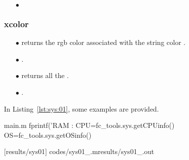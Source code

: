 \begin{itemize}
\item[$\bullet$] 

\end{itemize}

\subsubsection{xcolor}
\begin{itemize}
\item[$\bullet$]  returns the rgb color associated with the string color .
\item[$\bullet$]  .
\item[$\bullet$]  returns all the .
\item[$\bullet$]  .
\end{itemize}

In Listing~\ref{lst:sys:01}, some examples are provided.
\begin{filecontents*}{main.m}
fprintf('RAM : %
CPU=fc_tools.sys.getCPUinfo()
OS=fc_tools.sys.getOSinfo()
\end{filecontents*}
[results/sys01]
%
                      {codes/sys01_\fccmdname\fccmdversionabr.m}{results/sys01_\fccmdname\fccmdversionabr.out}
